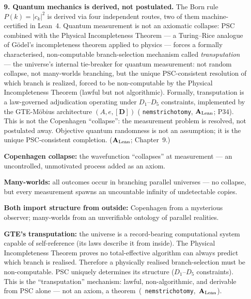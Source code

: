 \documentclass[11pt,openany]{book}
\theoremstyle{remark}
\newcommand{\lean}[1]{%
  \penalty-100
  \begingroup\def\_{\textunderscore\allowbreak}\texttt{#1}\endgroup}
\newcommand{\CatAL}{\ensuremath{\textbf{A}_{\rm Lean}}}
\begin{document}
\medskip

\textbf{9. Quantum mechanics is derived, not postulated.}
The Born rule $P(k) = |c_k|^2$ is derived via four independent routes, two
of them machine-certified in Lean~4.
Quantum measurement is not an axiomatic collapse: PSC combined with the
Physical Incompleteness Theorem --- a Turing--Rice analogue of
G\"{o}del's incompleteness theorem applied to physics --- forces a formally
characterised, non-computable branch-selection mechanism called
\emph{transputation} --- the universe's internal tie-breaker for quantum
measurement: not random collapse, not many-worlds branching, but the unique
PSC-consistent resolution of which branch is realized, forced to be non-computable
by the Physical Incompleteness Theorem (lawful but not algorithmic).
Formally, transputation is a law-governed adjudication operating under
$D_1$--$D_5$ constraints, implemented by the GTE-M\"{o}bius architecture
$(A, e, [\mathbf{D}])$ (\lean{nems\_trichotomy}, \CatAL; P34).
This is not the Copenhagen ``collapse'': the measurement problem is
resolved, not postulated away.
Objective quantum randomness is not an assumption; it is the unique
PSC-consistent completion.
(\CatAL; Chapter~9.)

\begin{tcolorbox}[colback=purple!4,colframe=purple!55!black,
  title={\textbf{Why Measurement Isn't Collapse — and Isn't Many-Worlds Either}},
  fonttitle=\small\bfseries, left=6pt, right=6pt, top=4pt, bottom=4pt]
\small
\textbf{Copenhagen collapse:} the wavefunction ``collapses'' at measurement --- an
uncontrolled, unmotivated process added as an axiom.

\smallskip
\textbf{Many-worlds:} all outcomes occur in branching parallel universes --- no collapse,
but every measurement spawns an uncountable infinity of undetectable copies.

\smallskip
\textbf{Both import structure from outside:} Copenhagen from a mysterious observer;
many-worlds from an unverifiable ontology of parallel realities.

\smallskip\noindent
\textbf{GTE's transputation:} the universe is a record-bearing computational system
capable of self-reference (its laws describe it from inside).
The Physical Incompleteness Theorem proves no total-effective algorithm can always
predict which branch is realised.
Therefore a physically realised branch-selection must be non-computable.
PSC uniquely determines its structure ($D_1$--$D_5$ constraints).
This is the ``transputation'' mechanism: lawful, non-algorithmic, and derivable from PSC
alone --- not an axiom, a theorem~\mbox{(\lean{nems\_trichotomy}, \CatAL)}.
\end{tcolorbox}
\end{document}
